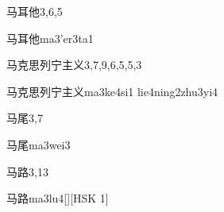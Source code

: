 \begin{entry}{马耳他}{3,6,5}
  \begin{phonetics}{马耳他}{ma3'er3ta1}
  \end{phonetics}
\end{entry}

\begin{entry}{马克思列宁主义}{3,7,9,6,5,5,3}
  \begin{phonetics}{马克思列宁主义}{ma3ke4si1 lie4ning2zhu3yi4}
  \end{phonetics}
\end{entry}

\begin{entry}{马尾}{3,7}
  \begin{phonetics}{马尾}{ma3wei3}
  \end{phonetics}
\end{entry}

\begin{entry}{马路}{3,13}
  \begin{phonetics}{马路}{ma3lu4}[][HSK 1]
  \end{phonetics}
\end{entry}


